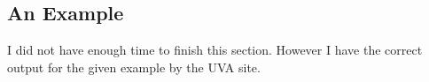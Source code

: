 \documentclass[12pt]{article}
\begin{document}

\subsection{An Example}
I did not have enough time to finish this section. However I have the correct output for the given example by the UVA site.



\end{document}
